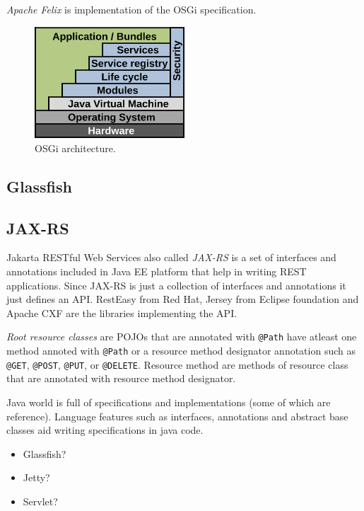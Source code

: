 \documentclass[a4paper]{article}
\begin{document}
\emph{Apache Felix} is implementation of the OSGi specification.

\begin{figure}[hbt]
    \begin{center}
        \includegraphics[width=0.5\textwidth]{graphics/osgi-architecture.png}
        \caption{OSGi architecture.}
    \end{center}
\end{figure}

\subsection*{Glassfish}


\subsection*{JAX-RS}
Jakarta RESTful Web Services also called \emph{JAX-RS} is a set of interfaces and annotations included in Java EE platform 
that help in writing REST applications. Since JAX-RS is just a collection of interfaces and annotations it just defines an API. 
RestEasy from Red Hat, Jersey from Eclipse foundation and Apache CXF are the libraries implementing the API.

\emph{Root resource classes} are POJOs that are annotated with \lstinline{@Path} have atleast one method annoted with
\lstinline{@Path} or a resource method designator annotation such as \lstinline{@GET}, \lstinline{@POST}, \lstinline{@PUT},
or \lstinline{@DELETE}. Resource method are methods of resource class that are annotated with resource method designator.

Java world is full of specifications and implementations (some of which are reference). Language features such as interfaces, 
annotations and abstract base classes aid writing specifications in java code.

\begin{itemize}
    \item Glassfish?
    \item Jetty?
    \item Servlet?
          
\end{itemize}
\end{document}
